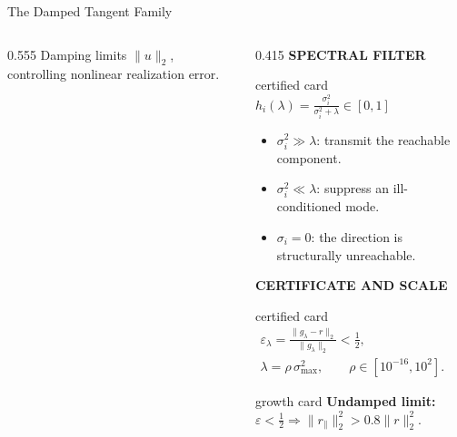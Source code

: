\begin{frame}[t]{The Damped Tangent Family}
\begin{columns}[T,onlytextwidth]
\begin{column}{0.555\textwidth}
      \vspace{0.08cm}
      {\fontsize{6.9}{8.2}\selectfont
      Damping limits $\lVert u\rVert_2$, controlling nonlinear realization error.}
    \end{column}

    \begin{column}{0.415\textwidth}
      {\color{EnstaBlue}\bfseries\scriptsize SPECTRAL FILTER}
      \vspace{0.04cm}

      \begin{beamercolorbox}[rounded=true,sep=0.10cm,wd=\linewidth]{certified card}
        \centering
        \fontsize{7.0}{8.3}\selectfont
        \(\displaystyle
          h_i(\lambda)=\frac{\sigma_i^2}{\sigma_i^2+\lambda}\in[0,1]
        \)
      \end{beamercolorbox}

      \vspace{0.04cm}
      {\fontsize{7.2}{8.6}\selectfont
      \begin{itemize}
        \setlength{\itemsep}{0.07cm}
        \item $\sigma_i^2\gg\lambda$: transmit the reachable component.
        \item $\sigma_i^2\ll\lambda$: suppress an ill-conditioned mode.
        \item $\sigma_i=0$: the direction is structurally unreachable.
      \end{itemize}}

      \vspace{0.03cm}
      {\color{EnstaBlue}\bfseries\scriptsize CERTIFICATE AND SCALE}
      \vspace{0.04cm}

      \begin{beamercolorbox}[rounded=true,sep=0.10cm,wd=\linewidth]{certified card}
        \centering
        \fontsize{6.8}{8.1}\selectfont
        \(\displaystyle
          \begin{gathered}
            \varepsilon_\lambda
            =\frac{\lVert g_\lambda-r\rVert_2}{\lVert g_\lambda\rVert_2}
            <\frac12,\\[4pt]
            \lambda=\rho\,\sigma_{\max}^2,\qquad
            \rho\in[10^{-16},10^2].
          \end{gathered}
        \)
      \end{beamercolorbox}

      \vspace{0.08cm}
      \begin{beamercolorbox}[rounded=true,sep=0.09cm,wd=\linewidth]{growth card}
        \centering
        {\fontsize{6.7}{8.0}\selectfont
        \textbf{Undamped limit:}\quad
        $\varepsilon<\tfrac12\Rightarrow
        \lVert r_{\parallel}\rVert_2^2>0.8\lVert r\rVert_2^2$.}
      \end{beamercolorbox}
    \end{column}
  \end{columns}
\end{frame}
